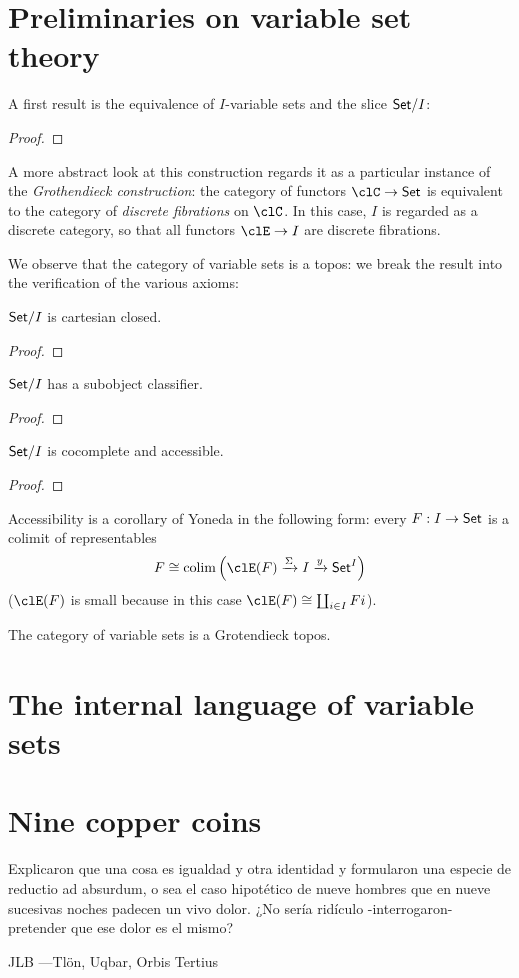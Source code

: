 \documentclass{amsart}
\begin{document}
\section{Preliminaries on variable set theory}
A first result is the equivalence of $I$-variable sets and the slice $\mathsf{Set}/I$: 
\begin{proposition}
  
\end{proposition}
\begin{proof}
  
\end{proof}
\begin{remark}
  A more abstract look at this construction regards it as a particular instance of the \emph{Grothendieck construction}: the category of functors $\clC\to\Set$ is equivalent to the category of \emph{discrete fibrations} on $\clC$. In this case, $I$ is regarded as a discrete category, so that all functors $\clE \to I$ are discrete fibrations.
\end{remark}
We observe that the category of variable sets is a topos: we break the result into the verification of the various axioms:
\begin{proposition}
$\mathsf{Set}/I$ is cartesian closed.
\end{proposition}
\begin{proof}
  
\end{proof}
\begin{proposition}
$\mathsf{Set}/I$ has a subobject classifier.
\end{proposition}
\begin{proof}
  
\end{proof}
\begin{proposition}
$\mathsf{Set}/I$ is cocomplete and accessible.
\end{proposition}
\begin{proof}
  
\end{proof}
Accessibility is a corollary of Yoneda in the following form: every $F : I \to \mathsf{Set}$ is a colimit of representables
\[
F \cong \colim\Big(\clE(F) \xto{\Sigma} I \xto{y} \Set^I\Big)  
\]
($\clE(F)$ is small because in this case $\clE(F)\cong\coprod_{i\in I}Fi$).
\begin{corollary}
  The category of variable sets is a Grotendieck topos.
\end{corollary}
\section{The internal language of variable sets}
\section{Nine copper coins}
\epigraph{Explicaron que una cosa es igualdad y otra identidad y formularon una especie de reductio
ad absurdum, o sea el caso hipotético de nueve hombres que en nueve sucesivas noches
padecen un vivo dolor. ¿No sería ridículo -interrogaron- pretender que ese dolor es el
mismo?}{JLB ---Tl\"on, Uqbar, Orbis Tertius}
\end{document}
